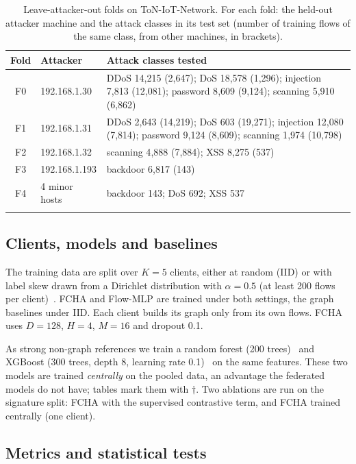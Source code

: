 \documentclass[pdflatex,sn-mathphys-num]{sn-jnl}
\begin{document}
\begin{table}[t]
\caption{Leave-attacker-out folds on ToN-IoT-Network. For each fold: the held-out attacker machine and the attack classes in its test set (number of training flows of the same class, from other machines, in brackets).}\label{tab:attackerfolds}
\begin{tabular*}{\textwidth}{@{\extracolsep\fill}cl>{\raggedright\arraybackslash}p{}}
\toprule
Fold & Attacker & Attack classes tested \\
\midrule
F0 & 192.168.1.30 & DDoS 14{,}215 (2{,}647); DoS 18{,}578 (1{,}296); injection 7{,}813 (12{,}081); password 8{,}609 (9{,}124); scanning 5{,}910 (6{,}862) \\
F1 & 192.168.1.31 & DDoS 2{,}643 (14{,}219); DoS 603 (19{,}271); injection 12{,}080 (7{,}814); password 9{,}124 (8{,}609); scanning 1{,}974 (10{,}798) \\
F2 & 192.168.1.32 & scanning 4{,}888 (7{,}884); XSS 8{,}275 (537) \\
F3 & 192.168.1.193 & backdoor 6{,}817 (143) \\
F4 & 4 minor hosts & backdoor 143; DoS 692; XSS 537 \\
\botrule
\end{tabular*}
\end{table}

\subsection{Clients, models and baselines}\label{sec:setup}

The training data are split over $K=5$ clients, either at random (IID) or with label skew drawn from a Dirichlet distribution with $\alpha=0.5$ (at least 200 flows per client)~\cite{li2022noniid}. FCHA and Flow-MLP are trained under both settings, the graph baselines under IID. Each client builds its graph only from its own flows. FCHA uses $D=128$, $H=4$, $M=16$ and dropout 0.1.

As strong non-graph references we train a random forest (200 trees)~\cite{breiman2001rf} and XGBoost (300 trees, depth 8, learning rate 0.1)~\cite{chen2016xgboost} on the same features. These two models are trained \emph{centrally} on the pooled data, an advantage the federated models do not have; tables mark them with $\dagger$. Two ablations are run on the signature split: FCHA with the supervised contrastive term, and FCHA trained centrally (one client).

\subsection{Metrics and statistical tests}\label{sec:metrics}
\end{document}
